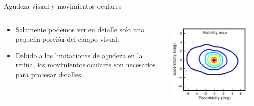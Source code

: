 \documentclass[compress]{beamer}
\begin{document}
\begin{frame}{Agudeza visual y movimientos oculares}

  \begin{columns}[T]
    \begin{column}{.6\textwidth}
        \vspace{0.8cm}
        \begin{itemize}
        \item Solamente podemos ver en detalle solo una pequeña porción del campo visual.
        \item Debido a las limitaciones de agudeza en la retina, los movimientos oculares son necesarios para procesar detalles.
        \end{itemize}
    \end{column}
    \begin{column}{.4\textwidth}
        \begin{center}
        \includegraphics[width=\textwidth]{images/visibility-map-sin-ref.png} 
        \end{center}
    \end{column}
  \end{columns}
\end{frame}
\end{document}
